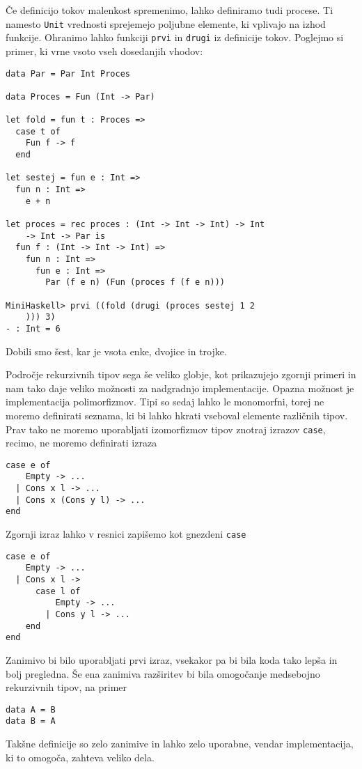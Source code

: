\documentclass[12pt,a4paper,openany]{book}
\begin{document}
Če definicijo tokov malenkost spremenimo, lahko definiramo tudi procese. Ti namesto \lstinline{Unit} vrednosti sprejemejo poljubne elemente, ki 
vplivajo na izhod funkcije. Ohranimo lahko funkciji \lstinline{prvi} in \lstinline{drugi} iz definicije tokov. Poglejmo si primer, ki vrne vsoto 
vseh dosedanjih vhodov:
\begin{lstlisting}
data Par = Par Int Proces

data Proces = Fun (Int -> Par)

let fold = fun t : Proces =>
  case t of
    Fun f -> f
  end

let sestej = fun e : Int =>
  fun n : Int =>
    e + n

let proces = rec proces : (Int -> Int -> Int) -> Int 
    -> Int -> Par is
  fun f : (Int -> Int -> Int) =>
    fun n : Int =>
      fun e : Int =>
        Par (f e n) (Fun (proces f (f e n)))
  
MiniHaskell> prvi ((fold (drugi (proces sestej 1 2
    ))) 3)
- : Int = 6
\end{lstlisting}
Dobili smo šest, kar je vsota enke, dvojice in trojke.



Področje rekurzivnih tipov sega še veliko globje, kot prikazujejo zgornji primeri in nam tako daje veliko možnosti za nadgradnjo implementacije. 
Opazna možnost je implementacija polimorfizmov. Tipi so sedaj lahko le monomorfni, torej ne moremo definirati seznama, ki bi lahko hkrati 
vseboval elemente različnih tipov. Prav tako ne moremo uporabljati izomorfizmov tipov znotraj izrazov \lstinline{case}, recimo, ne moremo definirati izraza
\begin{lstlisting}
case e of
    Empty -> ...
  | Cons x l -> ...
  | Cons x (Cons y l) -> ...
end
\end{lstlisting}
Zgornji izraz lahko v resnici zapišemo kot gnezdeni \lstinline{case}
\begin{lstlisting}
case e of
    Empty -> ...
  | Cons x l ->
      case l of
          Empty -> ...
        | Cons y l -> ...
    end
end
\end{lstlisting}
Zanimivo bi bilo uporabljati prvi izraz, vsekakor pa bi bila koda tako lepša in bolj pregledna.
Še ena zanimiva razširitev bi bila omogočanje medsebojno rekurzivnih tipov, na primer 
\begin{lstlisting}
data A = B
data B = A
\end{lstlisting}
Takšne definicije so zelo zanimive in lahko zelo uporabne, vendar implementacija, ki to omogoča, zahteva veliko dela. 

\newpage


\appendix

\newpage

\label{stran_literatura}
 
\end{document}
